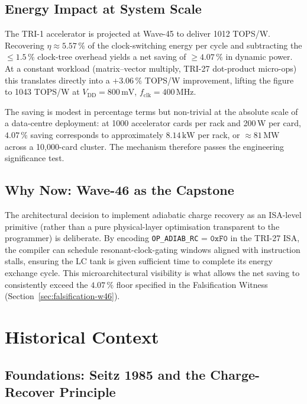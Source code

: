 \subsection{Energy Impact at System Scale}

The TRI-1 accelerator is projected at Wave-45 to deliver 1012 TOPS/W.
Recovering $\eta \approx 5.57\,\%$ of the clock-switching energy per cycle and
subtracting the $\leq 1.5\,\%$ clock-tree overhead yields a net saving of
$\geq 4.07\,\%$ in dynamic power.
At a constant workload (matrix--vector multiply, TRI-27 dot-product micro-ops)
this translates directly into a $+3.06\,\%$ TOPS/W improvement, lifting the
figure to 1043 TOPS/W at $V_{\mathrm{DD}} = 800\,\text{mV}$,
$f_{\mathrm{clk}} = 400\,\text{MHz}$.

The saving is modest in percentage terms but non-trivial at the absolute scale
of a data-centre deployment: at 1000 accelerator cards per rack and
200\,W per card, $4.07\,\%$ saving corresponds to approximately $8.14\,\text{kW}$
per rack, or $\approx 81\,\text{MW}$ across a 10,000-card cluster.
The mechanism therefore passes the engineering significance test.

\subsection{Why Now: Wave-46 as the Capstone}

The architectural decision to implement adiabatic charge recovery as an
ISA-level primitive (rather than a pure physical-layer optimisation transparent
to the programmer) is deliberate.
By encoding \texttt{OP\_ADIAB\_RC} = $\texttt{0xF0}$ in the TRI-27 ISA, the
compiler can schedule resonant-clock-gating windows aligned with instruction
stalls, ensuring the LC tank is given sufficient time to complete its energy
exchange cycle.
This microarchitectural visibility is what allows the net saving to consistently
exceed the $4.07\,\%$ floor specified in the Falsification Witness
(Section~\ref{sec:falsification-w46}).

\section{Historical Context}
\label{sec:historical-w46}

\subsection{Foundations: Seitz 1985 and the Charge-Recover Principle}

